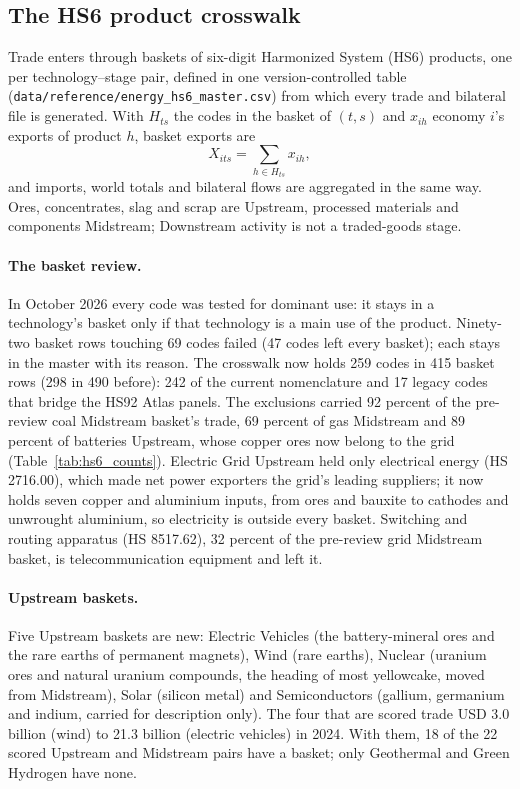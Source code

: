 \subsection{The HS6 product crosswalk}\label{subsec:data_crosswalk}

Trade enters through baskets of six-digit Harmonized System (HS6) products, one per
technology--stage pair, defined in one version-controlled table
(\texttt{data/reference/energy\_hs6\_master.csv}) from which every trade and bilateral file is
generated. With $H_{ts}$ the codes in the basket of $(t,s)$ and $x_{ih}$ economy $i$'s exports of
product $h$, basket exports are
\begin{equation}\label{eq:data_basket}
  X_{its}=\sum_{h\in H_{ts}}x_{ih},
\end{equation}
and imports, world totals and bilateral flows are aggregated in the same way. Ores,
concentrates, slag and scrap are Upstream, processed materials and components Midstream;
Downstream activity is not a traded-goods stage.

\paragraph{The basket review.} In October 2026 every code was tested for dominant use: it stays
in a technology's basket only if that technology is a main use of the product. Ninety-two basket
rows touching 69 codes failed (47 codes left every basket); each stays in the master with its
reason. The crosswalk now holds 259 codes in 415 basket rows (298 in 490 before): 242 of the
current nomenclature and 17 legacy codes that bridge the HS92 Atlas panels. The exclusions carried
92 percent of the pre-review coal Midstream basket's trade, 69 percent of gas Midstream and 89
percent of batteries Upstream, whose copper ores now belong to the grid
(Table~\ref{tab:hs6_counts}). Electric Grid Upstream held only electrical energy (HS 2716.00),
which made net power exporters the grid's leading suppliers; it now holds seven copper and
aluminium inputs, from ores and bauxite to cathodes and unwrought aluminium, so electricity is
outside every basket. Switching and routing apparatus (HS 8517.62), 32 percent of the pre-review
grid Midstream basket, is telecommunication equipment and left it.

\paragraph{Upstream baskets.} Five Upstream baskets are new: Electric Vehicles (the battery-mineral
ores and the rare earths of permanent magnets), Wind (rare earths), Nuclear (uranium ores and
natural uranium compounds, the heading of most yellowcake, moved from Midstream), Solar (silicon
metal) and Semiconductors (gallium, germanium and indium, carried for description only). The four
that are scored trade USD 3.0 billion (wind) to 21.3 billion (electric vehicles) in 2024. With
them, 18 of the 22 scored Upstream and Midstream pairs have a basket; only Geothermal and Green
Hydrogen have none.

